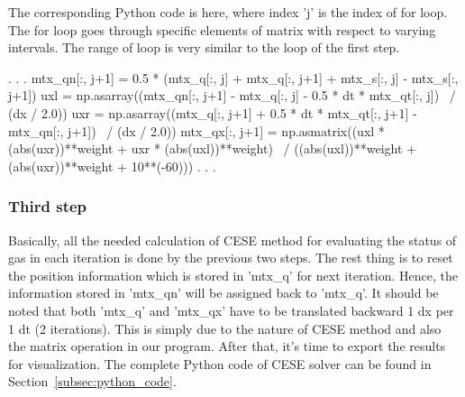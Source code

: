 \documentclass[a4paper,12pt,dvips]{article}
\begin{document}
The corresponding Python code is here, where index 'j' is the index of for loop. 
The for loop goes through specific elements of matrix with respect to varying 
intervals. The range of loop is very similar to the loop of the first step.
\begin{pythonNoIndex}
                            .
                            .
                            .
        mtx_qn[:, j+1] = 0.5 * (mtx_q[:, j] + mtx_q[:, j+1] + mtx_s[:, j] - mtx_s[:, j+1]) 
        uxl = np.asarray((mtx_qn[:, j+1] - mtx_q[:, j] - 0.5 * dt * mtx_qt[:, j]) \
                                                                    / (dx / 2.0))
        uxr = np.asarray((mtx_q[:, j+1] + 0.5 * dt * mtx_qt[:, j+1] - mtx_qn[:, j+1]) \
                                                                        / (dx / 2.0))
        mtx_qx[:, j+1] = np.asmatrix((uxl * (abs(uxr))**weight + uxr * (abs(uxl))**weight) \
                                      / ((abs(uxl))**weight + (abs(uxr))**weight + 10**(-60)))
                            .
                            .
                            .
\end{pythonNoIndex}

\subsubsection{Third step}
 \label{subsubsec:third_step}
Basically, all the needed calculation of CESE method for evaluating the status 
of gas in each iteration is done by the previous two steps. The rest thing is to 
reset the position information which is stored in 'mtx\_q' for next iteration. 
Hence, the information stored in 'mtx\_qn' will be assigned back to 'mtx\_q'. 
It should be noted that both 'mtx\_q' and 'mtx\_qx' have to be translated backward 
1 dx per 1 dt (2 iterations). This is simply due to the nature of CESE method 
and also the matrix operation in our program. After that, it's time to export 
the results for visualization. 
The complete Python code of CESE solver can be found 
in Section~\ref{subsec:python_code}.
\end{document}
